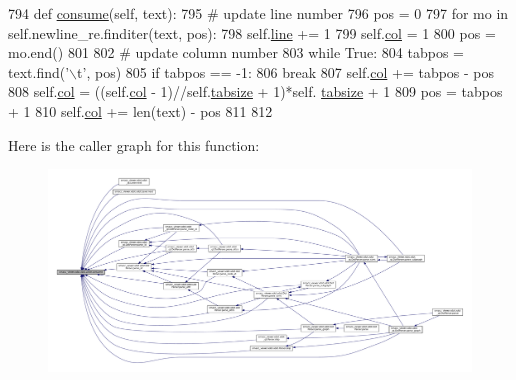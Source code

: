 \begin{DoxyCode}
794     \textcolor{keyword}{def }\hyperlink{classsmacc__viewer_1_1xdot_1_1xdot_1_1Lexer_a4f98cdb3cfb78976a9e4b096f300342d}{consume}(self, text):
795         \textcolor{comment}{# update line number}
796         pos = 0
797         \textcolor{keywordflow}{for} mo \textcolor{keywordflow}{in} self.newline\_re.finditer(text, pos):
798             self.\hyperlink{classsmacc__viewer_1_1xdot_1_1xdot_1_1Lexer_a0176a7344cbcc6622d7153fa8141440c}{line} += 1
799             self.\hyperlink{classsmacc__viewer_1_1xdot_1_1xdot_1_1Lexer_a1f662e52d39cd1cdddb5cfc02e549018}{col} = 1
800             pos = mo.end()
801 
802         \textcolor{comment}{# update column number}
803         \textcolor{keywordflow}{while} \textcolor{keyword}{True}:
804             tabpos = text.find(\textcolor{stringliteral}{'\(\backslash\)t'}, pos)
805             \textcolor{keywordflow}{if} tabpos == -1:
806                 \textcolor{keywordflow}{break}
807             self.\hyperlink{classsmacc__viewer_1_1xdot_1_1xdot_1_1Lexer_a1f662e52d39cd1cdddb5cfc02e549018}{col} += tabpos - pos
808             self.\hyperlink{classsmacc__viewer_1_1xdot_1_1xdot_1_1Lexer_a1f662e52d39cd1cdddb5cfc02e549018}{col} = ((self.\hyperlink{classsmacc__viewer_1_1xdot_1_1xdot_1_1Lexer_a1f662e52d39cd1cdddb5cfc02e549018}{col} - 1)//self.\hyperlink{classsmacc__viewer_1_1xdot_1_1xdot_1_1Lexer_a54e3985e9e746bf106819b7a3b340646}{tabsize} + 1)*self.
      \hyperlink{classsmacc__viewer_1_1xdot_1_1xdot_1_1Lexer_a54e3985e9e746bf106819b7a3b340646}{tabsize} + 1
809             pos = tabpos + 1
810         self.\hyperlink{classsmacc__viewer_1_1xdot_1_1xdot_1_1Lexer_a1f662e52d39cd1cdddb5cfc02e549018}{col} += len(text) - pos
811 
812 
\end{DoxyCode}


Here is the caller graph for this function\+:
\nopagebreak
\begin{figure}[H]
\begin{center}
\leavevmode
\includegraphics[width=350pt]{classsmacc__viewer_1_1xdot_1_1xdot_1_1Lexer_a4f98cdb3cfb78976a9e4b096f300342d_icgraph}
\end{center}
\end{figure}


